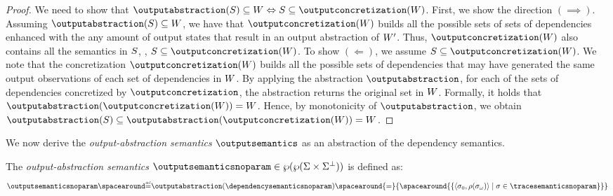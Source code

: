 \begin{proof}
  We need to show that $\outputabstraction(\defsetofsetoftraces)\subseteq \defsetofsetofdependencies \iff \defsetofsetoftraces\subseteq\outputconcretization(\defsetofsetofdependencies)$.
  First, we show the direction $(\implies)$.
  Assuming $\outputabstraction(\defsetofsetoftraces)\subseteq \defsetofsetofdependencies$, we have that $\outputconcretization(\defsetofsetofdependencies)$ builds all the possible sets of sets of dependencies enhanced with the any amount of output states that result in an output abstraction of $W'$. Thus, $\outputconcretization(\defsetofsetofdependencies)$ also contains all the semantics in $S$, \ie, $\defsetofsetoftraces\subseteq\outputconcretization(\defsetofsetofdependencies)$.
  To show $(\Leftarrow)$, we assume $\defsetofsetoftraces\subseteq\outputconcretization(\defsetofsetofdependencies)$.
  We note that the concretization $\outputconcretization(\defsetofsetofdependencies)$ builds all the possible sets of dependencies that may have generated the same output observations of each set of dependencies in $W$. By applying the abstraction $\outputabstraction$, for each of the sets of dependencies concretized by $\outputconcretization$, the abstraction returns the original set in $W$.
  Formally, it holds that $\outputabstraction(\outputconcretization(\defsetofsetofdependencies)) = \defsetofsetofdependencies$.
  Hence, by monotonicity of $\outputabstraction$, we obtain $\outputabstraction(\defsetofsetoftraces)\subseteq \outputabstraction(\outputconcretization(\defsetofsetofdependencies)) = \defsetofsetofdependencies$.
\end{proof}

We now derive the \emph{output-abstraction semantics} $\outputsemantics$ as an abstraction of the dependency semantics.

\begin{definition}
  The \emph{output-abstraction semantics} $\outputsemanticsnoparam\in\outputtype$ is defined as:
  \begin{align*}
    \outputsemanticsnoparam\DefeQ\outputabstraction(\dependencysemanticsnoparam)
    \spacearound{=}
    \{\spacearound{
      \setdef{
        \tuple{\retrieveinput{\deftrace}}{\outputobs(\retrieveoutput{\deftrace})}
      }{
        \deftrace \in \tracesemanticsnoparam
      }
    }\}
  \end{align*}
\end{definition}

